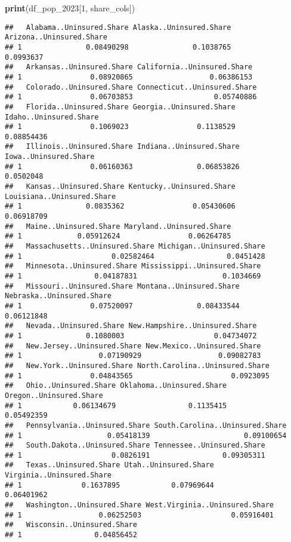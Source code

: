 \documentclass[
]{article}
\newenvironment{Shaded}{\begin{snugshade}}{\end{snugshade}}
\newcommand{\DecValTok}[1]{\textcolor[rgb]{0.00,0.00,0.81}{#1}}
\newcommand{\FunctionTok}[1]{\textcolor[rgb]{0.13,0.29,0.53}{\textbf{#1}}}
\newcommand{\NormalTok}[1]{#1}
\begin{document}
\begin{Shaded}
\begin{Highlighting}[]
\FunctionTok{print}\NormalTok{(df\_pop\_2023[}\DecValTok{1}\NormalTok{, share\_cols])}
\end{Highlighting}
\end{Shaded}

\begin{verbatim}
##   Alabama..Uninsured.Share Alaska..Uninsured.Share Arizona..Uninsured.Share
## 1               0.08490298               0.1038765                0.0993637
##   Arkansas..Uninsured.Share California..Uninsured.Share
## 1                0.08920865                  0.06386153
##   Colorado..Uninsured.Share Connecticut..Uninsured.Share
## 1                0.06703853                   0.05740886
##   Florida..Uninsured.Share Georgia..Uninsured.Share Idaho..Uninsured.Share
## 1                0.1069023                0.1138529             0.08854436
##   Illinois..Uninsured.Share Indiana..Uninsured.Share Iowa..Uninsured.Share
## 1                0.06160363               0.06853826             0.0502048
##   Kansas..Uninsured.Share Kentucky..Uninsured.Share Louisiana..Uninsured.Share
## 1               0.0835362                0.05430606                 0.06918709
##   Maine..Uninsured.Share Maryland..Uninsured.Share
## 1             0.05912624                0.06264785
##   Massachusetts..Uninsured.Share Michigan..Uninsured.Share
## 1                     0.02582464                 0.0451428
##   Minnesota..Uninsured.Share Mississippi..Uninsured.Share
## 1                 0.04187831                    0.1034669
##   Missouri..Uninsured.Share Montana..Uninsured.Share Nebraska..Uninsured.Share
## 1                0.07520097               0.08433544                0.06121848
##   Nevada..Uninsured.Share New.Hampshire..Uninsured.Share
## 1               0.1080003                     0.04734072
##   New.Jersey..Uninsured.Share New.Mexico..Uninsured.Share
## 1                  0.07190929                  0.09082783
##   New.York..Uninsured.Share North.Carolina..Uninsured.Share
## 1                0.04843565                       0.0923095
##   Ohio..Uninsured.Share Oklahoma..Uninsured.Share Oregon..Uninsured.Share
## 1            0.06134679                 0.1135415              0.05492359
##   Pennsylvania..Uninsured.Share South.Carolina..Uninsured.Share
## 1                    0.05418139                      0.09100654
##   South.Dakota..Uninsured.Share Tennessee..Uninsured.Share
## 1                     0.0826191                 0.09305311
##   Texas..Uninsured.Share Utah..Uninsured.Share Virginia..Uninsured.Share
## 1              0.1637895            0.07969644                0.06401962
##   Washington..Uninsured.Share West.Virginia..Uninsured.Share
## 1                  0.06252503                     0.05916401
##   Wisconsin..Uninsured.Share
## 1                 0.04856452
\end{verbatim}
\end{document}

